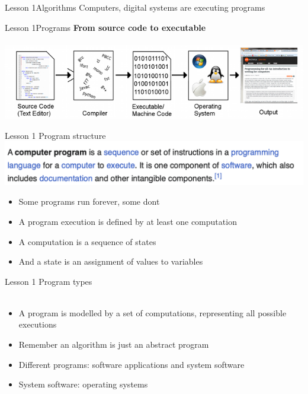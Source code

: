 \documentclass[aspectratio=1610]{beamer}
\begin{document}
\begin{frame}{Lesson 1}{Algorithms}
\Huge Computers, digital systems are executing programs
\end{frame}


\begin{frame}{Lesson 1}{Programs}
\Large
\textbf{From source code to executable}\\~\\ 
\includegraphics[scale=0.65]{Images/CompilationChain}
\end{frame}


\begin{frame}{Lesson 1}{}
{\Huge{Program structure}}
\includegraphics[scale=0.67]{Images/program}

\Large{
\begin{itemize}
    \item Some programs run forever, some dont
    \item A program execution is defined by at least one computation
    \item A computation is a sequence of states
    \item And a state is an assignment of values to variables
\end{itemize}}

\end{frame}


\begin{frame}{Lesson 1}{}
{\Huge{Program types}}\\~\\ 

\Large{
\begin{itemize}
    \item A program is modelled by a set of computations, representing all possible executions
    \item Remember an algorithm is just an abstract program
    \item Different programs: software applications and system software
    \item System software: operating systems
\end{itemize}}
\end{frame}
\end{document}
